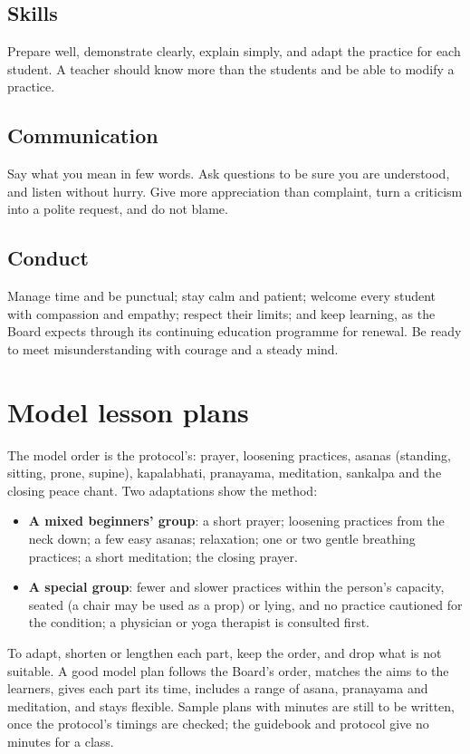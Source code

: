 \subsection*{Skills}
Prepare well, demonstrate clearly, explain simply, and adapt the practice for each student. A teacher should know more than the students and be able to modify a practice.

\subsection*{Communication}
Say what you mean in few words. Ask questions to be sure you are understood, and listen without hurry. Give more appreciation than complaint, turn a criticism into a polite request, and do not blame.

\subsection*{Conduct}
Manage time and be punctual; stay calm and patient; welcome every student with compassion and empathy; respect their limits; and keep learning, as the Board expects through its continuing education programme for renewal. Be ready to meet misunderstanding with courage and a steady mind.


\section{Model lesson plans}

The model order is the protocol's: prayer, loosening practices, asanas (standing, sitting, prone, supine), kapalabhati, pranayama, meditation, sankalpa and the closing peace chant. Two adaptations show the method:
\begin{itemize}
\item \textbf{A mixed beginners' group}: a short prayer; loosening practices from the neck down; a few easy asanas; relaxation; one or two gentle breathing practices; a short meditation; the closing prayer.
\item \textbf{A special group}: fewer and slower practices within the person's capacity, seated (a chair may be used as a prop) or lying, and no practice cautioned for the condition; a physician or yoga therapist is consulted first.
\end{itemize}
To adapt, shorten or lengthen each part, keep the order, and drop what is not suitable. A good model plan follows the Board's order, matches the aims to the learners, gives each part its time, includes a range of asana, pranayama and meditation, and stays flexible. Sample plans with minutes are still to be written, once the protocol's timings are checked; the guidebook and protocol give no minutes for a class.

